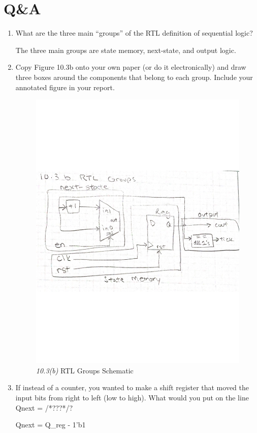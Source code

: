 \documentclass[11pt]{article}
\begin{document}
\section*{Q\&A}
\begin{enumerate}
  \item What are the three main “groups” of the RTL definition of sequential logic?
  
  The three main groups are state memory, next-state, and output logic.
  
  \item Copy Figure 10.3b onto your own paper (or do  it  electronically) and draw three  boxes around the components that belong to each group. Include your annotated figure  in your report.
  
  \begin{figure}[ht]\centering
  	\includegraphics[width=1\textwidth]{rtl_groups}
  	\caption{\textit{10.3(b)} RTL Groups Schematic}
  	\label{fig:sim_with_table}
  \end{figure}
  \clearpage
  
  \item If instead of a counter, you wanted to make a shift register that moved the input  bits from right to left (low to high). What would you put on the line Qnext = /*???*/?
  
  Qnext = Q\_reg - 1'b1
  

\end{enumerate}
\end{document}
